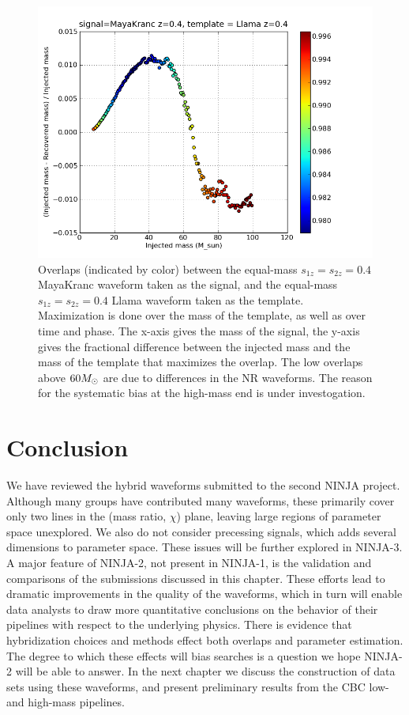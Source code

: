 \begin{figure}
  \includegraphics[width=\linewidth]{figures/ninja2/maya_llama_z0d4_max_over_m}
  \caption[Overlaps between spinning submissions maximized over mass]{
  \label{f:max_over_m_z4}
Overlaps (indicated by color) between the equal-mass $s_{1z} = s_{2z}
= 0.4$ MayaKranc waveform taken as the signal, and the equal-mass
$s_{1z} = s_{2z} = 0.4$ Llama waveform taken
as the template.  Maximization is done over the mass of the template,
as well as over time and phase.  The x-axis gives the mass of the
signal, the y-axis gives the fractional difference between the
injected mass and the mass of the template that maximizes the overlap.
The low overlaps above $60 M_\odot$ are due to differences in the NR
waveforms.  The reason for the systematic bias at the high-mass end is
under investogation.}
\end{figure}%


\section{Conclusion}

We have reviewed the hybrid waveforms submitted to the second NINJA
project.  Although many groups have contributed many waveforms, these
primarily cover only two lines  in the (mass ratio, $\chi$) plane,
leaving large regions of parameter space unexplored.  We also do not
consider precessing signals, which adds several dimensions to
parameter space.  These issues will be further explored in NINJA-3.  A
major feature of NINJA-2, not present in NINJA-1, is the validation
and comparisons of the submissions discussed in this chapter.  These
efforts lead to dramatic improvements in the quality of the waveforms,
which in turn will enable data analysts to draw more quantitative
conclusions on the behavior of their pipelines with respect to the
underlying physics.  There is evidence that hybridization choices and
methods effect both overlaps and parameter estimation.   The degree to
which these effects will bias searches is a question we hope NINJA-2
will be able to answer.  In the next chapter we discuss the
construction of data sets using these waveforms, and present
preliminary results from the CBC low- and high-mass pipelines.


